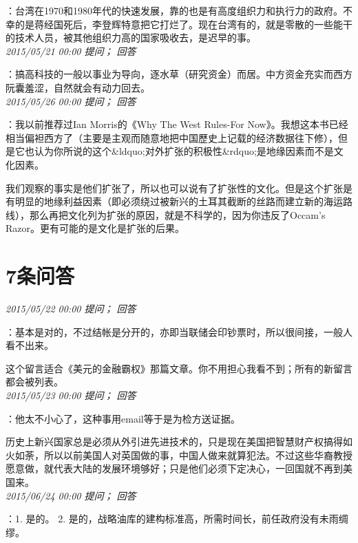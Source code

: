 \documentclass[twocolumn]{ctexart}
\begin{document}
：台湾在1970和1980年代的快速发展，靠的也是有高度组织力和执行力的政府。不幸的是蒋经国死后，李登辉特意把它打烂了。现在台湾有的，就是零散的一些能干的技术人员，被其他组织力高的国家吸收去，是迟早的事。\\

\textit{\hfill\noindent\small 2015/05/21 00:00 提问； 回答}

：搞高科技的一般以事业为导向，逐水草（研究资金）而居。中方资金充实而西方阮囊羞涩，自然就会有动力回去。\\

\textit{\hfill\noindent\small 2015/05/26 00:00 提问； 回答}

：我以前推荐过Ian Morris的《Why The West Rules-For Now》。我想这本书已经相当偏袒西方了（主要是主观而随意地把中国歷史上记载的经济数据往下修），但是它也认为你所说的这个\&ldquo;对外扩张的积极性\&rdquo;是地缘因素而不是文化因素。

我们观察的事实是他们扩张了，所以也可以说有了扩张性的文化。但是这个扩张是有明显的地缘利益因素（即必须绕过被新兴的土耳其截断的丝路而建立新的海运路线），那么再把文化列为扩张的原因，就是不科学的，因为你违反了Occam's Razor。更有可能的是文化是扩张的后果。\\

\section{7条问答}

\textit{\hfill\noindent\small 2015/05/22 00:00 提问； 回答}

：基本是对的，不过结帐是分开的，亦即当联储会印钞票时，所以很间接，一般人看不出来。

这个留言适合《美元的金融霸权》那篇文章。你不用担心我看不到；所有的新留言都会被列表。\\

\textit{\hfill\noindent\small 2015/05/23 00:00 提问； 回答}

：他太不小心了，这种事用email等于是为检方送证据。

历史上新兴国家总是必须从外引进先进技术的，只是现在美国把智慧财产权搞得如火如荼，所以以前美国人对英国做的事，中国人做来就算犯法。不过这些华裔教授愿意做，就代表大陆的发展环境够好；只是他们必须下定决心，一回国就不再到美国来。\\

\textit{\hfill\noindent\small 2015/06/24 00:00 提问； 回答}

：1. 是的。
2. 是的，战略油库的建构标准高，所需时间长，前任政府没有未雨绸缪。
\end{document}
